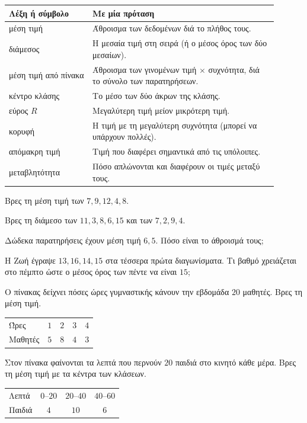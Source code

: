 

\renewcommand{\arraystretch}{1.5}
\begin{longtable}{@{}>{\raggedright\arraybackslash}p{0.28\linewidth} >{\raggedright\arraybackslash}p{0.62\linewidth}@{}}
\toprule
\textbf{Λέξη ή σύμβολο} & \textbf{Με μία πρόταση}\\
\midrule
\endhead
μέση τιμή & Άθροισμα των δεδομένων διά το πλήθος τους.\\
διάμεσος & Η μεσαία τιμή στη σειρά (ή ο μέσος όρος των δύο μεσαίων).\\
μέση τιμή από πίνακα & Άθροισμα των γινομένων τιμή $\times$ συχνότητα, διά το σύνολο των παρατηρήσεων.\\
κέντρο κλάσης & Το μέσο των δύο άκρων της κλάσης.\\
εύρος $R$ & Μεγαλύτερη τιμή μείον μικρότερη τιμή.\\
κορυφή & Η τιμή με τη μεγαλύτερη συχνότητα (μπορεί να υπάρχουν πολλές).\\
απόμακρη τιμή & Τιμή που διαφέρει σημαντικά από τις υπόλοιπες.\\
μεταβλητότητα & Πόσο απλώνονται και διαφέρουν οι τιμές μεταξύ τους.\\
\bottomrule
\end{longtable}


\ex Βρες τη μέση τιμή των $7, 9, 12, 4, 8$.

\ex Βρες τη διάμεσο των $11, 3, 8, 6, 15$ και των $7, 2, 9, 4$.

\ex Δώδεκα παρατηρήσεις έχουν μέση τιμή $6{,}5$. Πόσο είναι το άθροισμά τους;

\ex Η Ζωή έγραψε $13, 16, 14, 15$ στα τέσσερα πρώτα διαγωνίσματα. Τι βαθμό χρειάζεται στο πέμπτο ώστε ο μέσος όρος των πέντε να είναι $15$;

\ex Ο πίνακας δείχνει πόσες ώρες γυμναστικής κάνουν την εβδομάδα $20$ μαθητές. Βρες τη μέση τιμή.\par
\begin{center}
\renewcommand{\arraystretch}{1.25}
\begin{tabular}{lcccc}
\toprule
Ώρες & $1$ & $2$ & $3$ & $4$\\
Μαθητές & $5$ & $8$ & $4$ & $3$\\
\bottomrule
\end{tabular}
\end{center}

\ex Στον πίνακα φαίνονται τα λεπτά που περνούν $20$ παιδιά στο κινητό κάθε μέρα. Βρες τη μέση τιμή με τα κέντρα των κλάσεων.\par
\begin{center}
\renewcommand{\arraystretch}{1.25}
\begin{tabular}{lccc}
\toprule
Λεπτά & $0$--$20$ & $20$--$40$ & $40$--$60$\\
Παιδιά & $4$ & $10$ & $6$\\
\bottomrule
\end{tabular}
\end{center}


